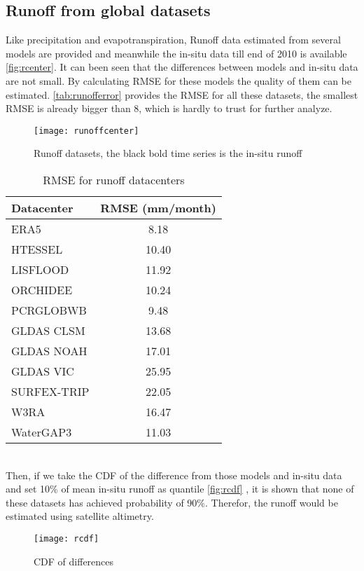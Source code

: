 \subsection{Runoff from global datasets}
Like precipitation and evapotranspiration, Runoff data estimated from several models are provided and meanwhile the in-situ data till end of 2010 is available \autoref{fig:rcenter}. It can been seen that the differences between models and in-situ data are not small.  By calculating RMSE for these models the quality of them can be estimated. \autoref{tab:runofferror} provides the RMSE for all these datasets, the smallest RMSE is already bigger than 8, which is hardly to trust for further analyze. 
\begin{figure}[htbp]\centering
	\centering
	\texttt{[image: runoffcenter]} %
	\caption{Runoff datasets, the black bold time series is the in-situ runoff} 
	\label{fig:rcenter}
\end{figure}
\begin{table}[htbp]\label{tab:rmse} \centering
	\begin{tabular}{|l|c|}
		\hline
		Datacenter  & RMSE (mm/month) \\ \hline
		ERA5        & 8.18  \\ \hline
		HTESSEL     & 10.40 \\ \hline
		LISFLOOD    & 11.92 \\ \hline
		ORCHIDEE    & 10.24 \\ \hline
		PCRGLOBWB   & 9.48  \\ \hline
		GLDAS CLSM  & 13.68 \\ \hline
		GLDAS NOAH  & 17.01 \\ \hline
		GLDAS VIC   & 25.95 \\ \hline
		SURFEX-TRIP & 22.05 \\ \hline
		W3RA        & 16.47 \\ \hline
		WaterGAP3   & 11.03 \\ \hline
	\end{tabular}
	\caption{RMSE for runoff datacenters}
	\label{tab:runofferror}
\end{table}\\
Then, if we take the CDF of the difference from those models and in-situ data and set 10\% of mean in-situ runoff as quantile \autoref{fig:rcdf} , it is shown that none of these datasets has achieved probability of 90\%. Therefor, the runoff would be estimated using satellite altimetry. 
\begin{figure}[htbp]
	\centering
	\texttt{[image: rcdf]} %
	\caption{CDF of differences} 
	\label{fig:rcdf}
\end{figure}\\
